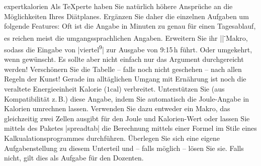 \documentclass[
	solution,
	blatt=6,
	ausgabe=24.\,05.\,2010,
	rückgabe=28.\,05.\,2010
]{lcourse-hd}
\newcommand\zeit[2]{#1\textsuperscript{#2}}
\begin{document}
\begin{expertexercise}[
  name={Kalorien – advanced},
  abgabe = Quellcode per Mail{,} Quellcode und fertiges Dokument ausgedruckt.]{expertkalorien}
Als \TeX perte haben Sie natürlich höhere Ansprüche an die Möglichkeiten Ihres Diätplanes. Ergänzen Sie daher die einzelnen Aufgaben um folgende Features:
Oft ist die Angabe in Minuten zu genau für einen Tagesablauf, es reichen meist die umgangssprachlichen Angaben. Erweitern Sie ihr |\zeit|-Makro, sodass die Eingabe von |\zeit{viertel}{9}| zur Ausgabe von 9:15\,h führt. Oder umgekehrt, wenn gewünscht. Es sollte aber nicht einfach nur das Argument durchgereicht werden!
Verschönern Sie die Tabelle – falls noch nicht geschehen – nach allen Regeln der Kunst!
Gerade im alltäglichen Umgang mit Ernährung ist noch die veraltete Energieeinheit Kalorie ($1\mathrm{cal}$) verbreitet. Unterstützen Sie (aus Kompatibilität z.\,B.) diese Angabe, indem Sie automatisch die Joule-Angabe in Kalorien umrechnen lassen. Verwenden Sie dazu entweder ein Makro, das gleichzeitig zwei Zellen ausgibt für den Joule und Kalorien-Wert oder lassen Sie mittels des Paketes |spreadtab| die Berechnung mittels einer Formel im Stile eines Kalkualationsprogrammes durchführen.
Überlegen Sie sich eine eigene Aufgabenstellung zu diesem Unterteil und – falls möglich – lösen Sie sie. Falls nicht, gilt dies als Aufgabe für den Dozenten.
\end{expertexercise}
\end{document}
